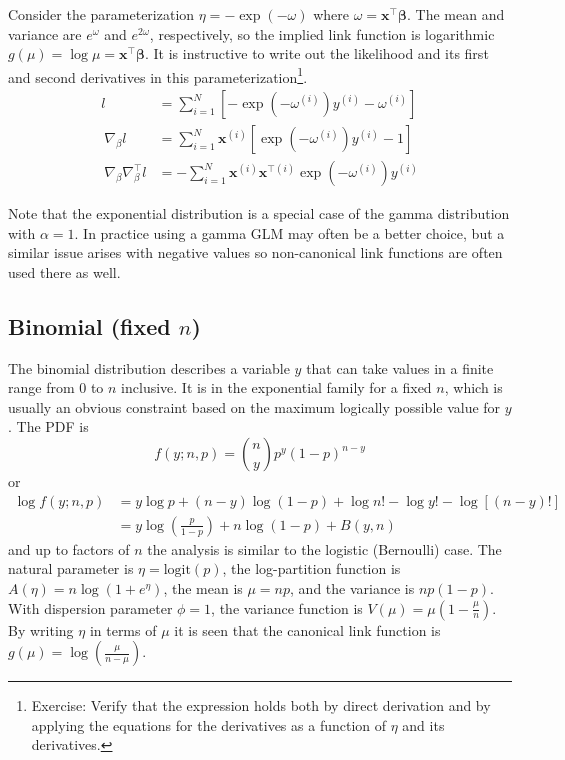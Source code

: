 \documentclass{article}
\newcommand{\bbeta}{\boldsymbol{\beta}}
\begin{document}
Consider the parameterization \(\eta = -\exp(-\omega)\) where \(
\omega = \mathbf{x}^\intercal \bbeta\).
The mean and variance are \(e^{\omega}\) and \(e^{2\omega}\), respectively,
so the implied link function is logarithmic \(g(\mu) = \log \mu =
\mathbf{x}^\intercal \bbeta \).
It is instructive to write out the likelihood and its first and second
derivatives in this parameterization\footnote{
    Exercise: Verify that the expression holds both by direct derivation and by applying
    the equations for the derivatives as a function of \(\eta\) and its derivatives.
}.
\begin{align}
l &= \sum_{i=1}^N \left[ - \exp\left(-\omega^{(i)}\right) y^{(i)} - \omega^{(i)} \right]\\\
\nabla_{\beta} l &= \sum_{i=1}^N \mathbf{x}^{(i)} \left[ \exp\left(-\omega^{(i)}\right) y^{(i)} - 1 \right] \\\
\nabla_{\beta} \nabla^\intercal_{\beta} l &= - \sum_{i=1}^N \mathbf{x}^{(i)}
\mathbf{x}^{\intercal(i)} \exp\left(-\omega^{(i)}\right) y^{(i)}
\end{align}

Note that the exponential distribution is a special case of the gamma
distribution with \(\alpha = 1\). In practice using a gamma GLM may often be a
better choice, but a similar issue arises with negative values so non-canonical
link functions are often used there as well.

\subsection{Binomial (fixed \(n\))}

The binomial distribution describes a variable \(y\) that can take values in a
finite range from \(0\) to \(n\) inclusive. It is in the exponential family
for a fixed \(n\), which is usually an obvious constraint based on the maximum
logically possible value for \(y\). The PDF is
\[ f(y; n, p) =
\binom{n}{y} p^y (1-p)^{n-y}
\]
or
\begin{align}
\log f(y; n, p) &= y \log p + (n-y) \log(1-p) + \log n! - \log y! - \log[(n-y)!] \\\
&= y \log \left( \frac{p}{1-p} \right) + n \log(1-p) + B(y, n)
\end{align}
and up to factors of \(n\) the analysis is similar to the logistic (Bernoulli)
case.
The natural parameter is \(\eta = \textrm{logit}(p)\), the log-partition
function is \(A(\eta) = n \log(1 + e^\eta)\), the mean is \(\mu = np\), and
the variance is \(np(1-p)\). With dispersion parameter \(\phi = 1\), the
variance function is \(V(\mu) = \mu\left(1 - \frac{\mu}{n}\right)\).
By writing \(\eta\) in terms of \(\mu\) it is seen that the canonical link
function is \(g(\mu) = \log\left( \frac{\mu}{n - \mu}\right) \).
\end{document}
